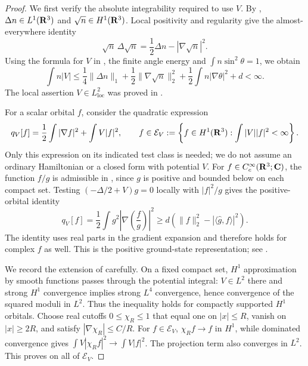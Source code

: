 \begin{proof}
We first verify the absolute integrability required to use $V$.
By , $\Delta n\in L^1(\mathbf R^3)$ and
$\sqrt n\in H^1(\mathbf R^3)$.  Local positivity and regularity give the
almost-everywhere identity
\[
 \sqrt n\,\Delta\sqrt n
 =\frac12\Delta n-|\nabla\sqrt n|^2.
\]
Using the formula for $V$ in , the finite
angle energy and $\int n\sin^2\theta=1$, we obtain
\begin{equation}
 \int n|V|
 \le \frac14\|\Delta n\|_1
      +\frac12\|\nabla\sqrt n\|_2^2
      +\frac12\int n|\nabla\theta|^2+d
 <\infty.
 \label{eq:ensemble-V-integrability}
\end{equation}
The local assertion $V\in L^2_{\mathrm{loc}}$ was proved in
.

For a scalar orbital $f$, consider the quadratic expression
\[
 q_V[f]=\frac12\int|\nabla f|^2+\int V|f|^2,
 \qquad
 f\in\mathcal E_V
 :=\left\{f\in H^1(\mathbf R^3):\int|V||f|^2<\infty\right\}.
\]
Only this expression on its indicated test class is needed; we do not
assume an ordinary Hamiltonian or a closed form with potential $V$.
For $f\in C_c^\infty(\mathbf R^3;\mathbf C)$, the function $f/g$ is admissible in
, since $g$ is positive and bounded below on each
compact set.  Testing $(-\Delta/2+V)g=0$ locally with $|f|^2/g$ gives
the positive-orbital identity
\begin{equation}
 q_V[f]
 =\frac12\int g^2\left|\nabla\left(\frac f g\right)\right|^2
 \ge d\left(\|f\|_2^2-|\langle\widehat g,f\rangle|^2\right).
 \label{eq:ensemble-orbital-bound}
\end{equation}
The identity uses real parts in the gradient expansion and therefore
holds for complex $f$ as well.
This is the positive ground-state representation; see
\cite[Section~2.3, equation~(2.12)]{FS08}.

We record the extension of  carefully.
On a fixed compact set, $H^1$ approximation by smooth functions passes
through the potential integral: $V\in L^2$ there and strong $H^1$
convergence implies strong $L^4$ convergence, hence convergence of the
squared moduli in $L^2$.  Thus the inequality holds for compactly
supported $H^1$ orbitals.  Choose real cutoffs $0\le\chi_R\le1$ that
equal one on $|x|\le R$, vanish on $|x|\ge2R$, and satisfy
$|\nabla\chi_R|\le C/R$.  For $f\in\mathcal E_V$,
$\chi_Rf\to f$ in $H^1$, while dominated convergence gives
$\int V|\chi_Rf|^2\to\int V|f|^2$.  The projection term also converges
in $L^2$.  This proves  on all of
$\mathcal E_V$.


\end{proof}
